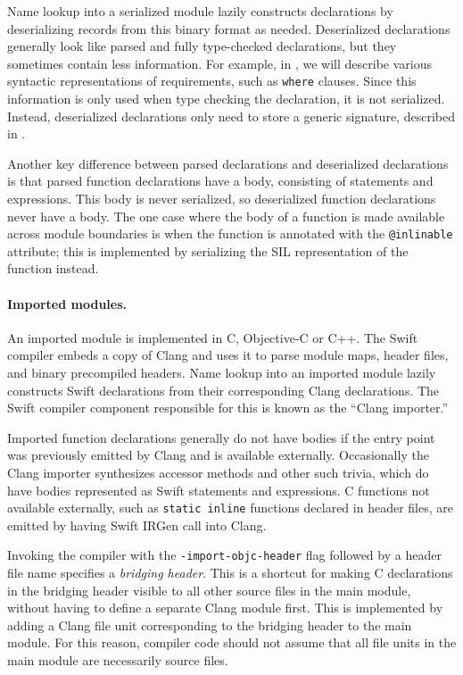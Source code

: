 \documentclass[../generics]{subfiles}
\begin{document}
Name lookup into a serialized module lazily constructs declarations by deserializing records from this binary format as needed. Deserialized declarations generally look like parsed and fully type-checked declarations, but they sometimes contain less information. For example, in , we will describe various syntactic representations of requirements, such as \texttt{where} clauses. Since this information is only used when type checking the declaration, it is not serialized. Instead, deserialized declarations only need to store a generic signature, described in .

Another key difference between parsed declarations and deserialized declarations is that parsed function declarations have a body, consisting of statements and expressions. This body is never serialized, so deserialized function declarations never have a body. The one case where the body of a function is made available across module boundaries is when the function is annotated with the \texttt{@inlinable} attribute; this is implemented by serializing the SIL representation of the function instead.

\paragraph{Imported modules.} An imported module is implemented in C, Objective-C or C++. The Swift compiler embeds a copy of Clang and uses it to parse module maps, header files, and binary precompiled headers. Name lookup into an imported module lazily constructs Swift declarations from their corresponding Clang declarations. The Swift compiler component responsible for this is known as the ``Clang importer.''

Imported function declarations generally do not have bodies if the entry point was previously emitted by Clang and is available externally. Occasionally the Clang importer synthesizes accessor methods and other such trivia, which do have bodies represented as Swift statements and expressions. C functions not available externally, such as \texttt{static inline} functions declared in header files, are emitted by having Swift IRGen call into Clang.

Invoking the compiler with the \texttt{-import-objc-header} flag followed by a header file name specifies a \emph{bridging header}. This is a shortcut for making C declarations in the bridging header visible to all other source files in the main module, without having to define a separate Clang module first. This is implemented by adding a Clang file unit corresponding to the bridging header to the main module. For this reason, compiler code should not assume that all file units in the main module are necessarily source files.
\end{document}
